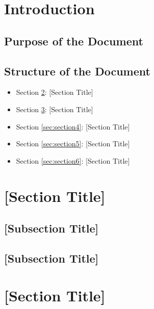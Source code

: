 \documentclass[a4paper,12pt]{article}
\begin{document}
\newpage

\tableofcontents %

\newpage

\section{{Introduction}}

\lipsum[1-2]

\subsection{{Purpose of the Document}}
\lipsum[3]

\subsection{{Structure of the Document}}
\begin{itemize}
    \item Section \ref{sec:section2}: [Section Title]
    \item Section \ref{sec:section3}: [Section Title]
    \item Section \ref{sec:section4}: [Section Title]
    \item Section \ref{sec:section5}: [Section Title]
    \item Section \ref{sec:section6}: [Section Title]
\end{itemize}

\newpage

\section{{[Section Title]}}
\label{sec:section2}

\lipsum[4-5]

\subsection{{[Subsection Title]}}
\lipsum[6]

\subsection{{[Subsection Title]}}
\lipsum[7]

\newpage

\section{{[Section Title]}}
\label{sec:section3}
\end{document}
